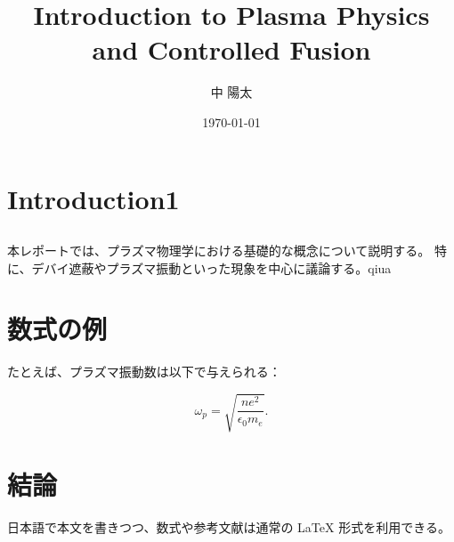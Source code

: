 \documentclass[a4paper,12pt]{article}
\title{Introduction to Plasma Physics and Controlled Fusion}
\author{中 陽太}
\date{\today}
\begin{document}
\maketitle
\section{Introduction1}
\subsection{}
本レポートでは、プラズマ物理学における基礎的な概念について説明する。
特に、デバイ遮蔽やプラズマ振動といった現象を中心に議論する。qiua

\section{数式の例}
たとえば、プラズマ振動数は以下で与えられる：

\[
\omega_p = \sqrt{\frac{n e^2}{\epsilon_0 m_e}}.
\]

\section{結論}
日本語で本文を書きつつ、数式や参考文献は通常の LaTeX 形式を利用できる。
\end{document}
